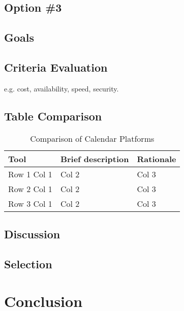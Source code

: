 \documentclass[letterpaper,10pt,draftclsnofoot,onecolumn,titlepage]{IEEEtran}
\begin{document}
	\subsection{Option \#3}
	\subsection{Goals}
	\subsection{Criteria Evaluation}
	e.g. cost, availability, speed, security.
	\subsection{Table Comparison}
	\begin{table}[ht]
	\caption{Comparison of Calendar Platforms}
	\begin{center}
	\begin{tabular} { | m{3cm} | m{5cm} | m{5cm} | }
	\hline\hline
	Tool & Brief description & Rationale \\ [0.5ex]
	\hline
	Row 1 Col 1 & Col 2 & Col 3 \\
	\hline
	Row 2 Col 1 & Col 2 & Col 3 \\
	\hline
	Row 3 Col 1 & Col 2 & Col 3 \\
	\hline
	\end{tabular}
	\end{center}
	\end{table}
	\subsection{Discussion}
	\subsection{Selection}
	\clearpage
	\section{Conclusion}

	
	
\end{document}
